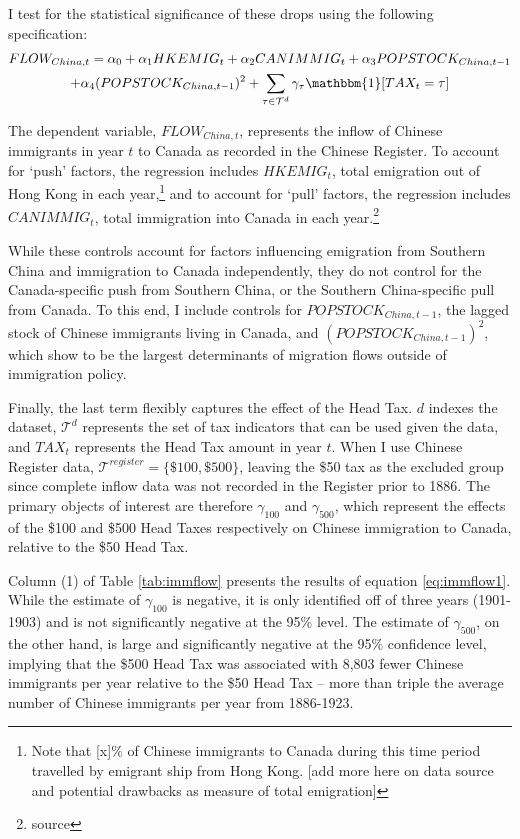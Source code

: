I test for the statistical significance of these drops using the following specification: 
\begin{multline}
    \label{eq:immflow1}
    FLOW_{China,t} = \alpha_0 + \alpha_1 HKEMIG_t + \alpha_2 CANIMMIG_t + \alpha_3 POPSTOCK_{China, t-1} \\ + \alpha_4 (POPSTOCK_{China, t-1})^2 + \sum_{\tau \in \mathcal{T}^d} \gamma_\tau \mathbbm{1}[TAX_t = \tau]
\end{multline}

The dependent variable, $FLOW_{China,t}$, represents the inflow of Chinese immigrants in year $t$ to Canada as recorded in the Chinese Register. To account for `push' factors, the regression includes $HKEMIG_t$, total emigration out of Hong Kong in each year,\footnote{Note that [x]\% of Chinese immigrants to Canada during this time period travelled by emigrant ship from Hong Kong. [add more here on data source and potential drawbacks as measure of total emigration]} and to account for `pull' factors, the regression includes $CANIMMIG_t$, total immigration into Canada in each year.\footnote{source}

While these controls account for factors influencing emigration from Southern China and immigration to Canada independently, they do not control for the Canada-specific push from Southern China, or the Southern China-specific pull from Canada. To this end, I include controls for $POPSTOCK_{China,t-1}$, the lagged stock of Chinese immigrants living in Canada, and $(POPSTOCK_{China,t-1})^2$, which \citet{Clarketal2007} show to be the largest determinants of migration flows outside of immigration policy.

Finally, the last term flexibly captures the effect of the Head Tax. $d$ indexes the dataset, $\mathcal{T}^d$ represents the set of tax indicators that can be used given the data, and $TAX_t$ represents the Head Tax amount in year $t$. When I use Chinese Register data, $\mathcal{T}^{register} = \{\$100,\$500\}$, leaving the \$50 tax as the excluded group since complete inflow data was not recorded in the Register prior to 1886. The primary objects of interest are therefore $\gamma_{100}$ and $\gamma_{500}$, which represent the effects of the \$100 and \$500 Head Taxes respectively on Chinese immigration to Canada, relative to the \$50 Head Tax.

Column (1) of Table \ref{tab:immflow} presents the results of equation \ref{eq:immflow1}. While the estimate of $\gamma_{100}$ is negative, it is only identified off of three years (1901-1903) and is not significantly negative at the 95\% level. The estimate of $\gamma_{500}$, on the other hand, is large and significantly negative at the 95\% confidence level, implying that the \$500 Head Tax was associated with 8,803 fewer Chinese immigrants per year relative to the \$50 Head Tax -- more than triple the average number of Chinese immigrants per year from 1886-1923.


